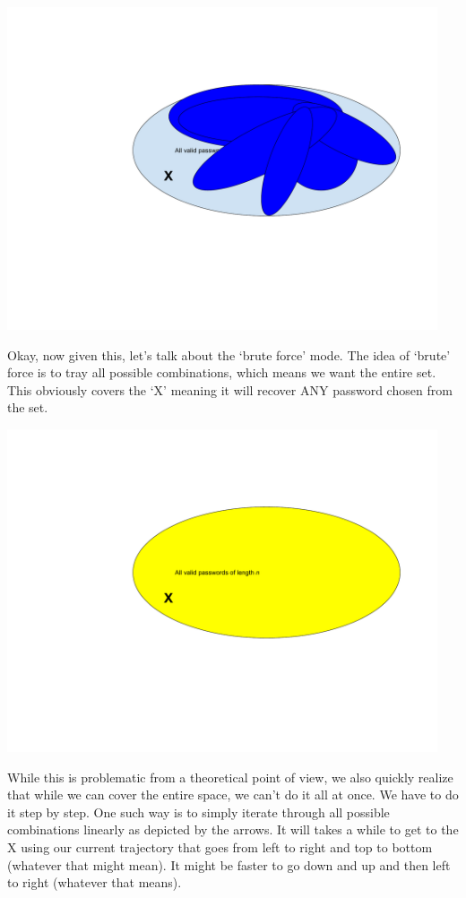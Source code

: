 \includegraphics[width=5in]{Assignments/images/PasswordCracking_7}

Okay, now given this, let’s talk about the ‘brute force’ mode. The idea of ‘brute’ force is to tray all possible combinations, which means we want the entire set. This obviously covers the ‘X’ meaning it will recover ANY password chosen from the set.

\includegraphics[width=5in]{Assignments/images/PasswordCracking_8}

While this is problematic from a theoretical point of view, we also quickly realize that while we can cover the entire space, we can’t do it all at once. We have to do it step by step. One such way is to simply iterate through all possible combinations linearly as depicted by the arrows. It will takes a while to get to the X using our current trajectory that goes from left to right and top to bottom (whatever that might mean). It might be faster to go down and up and then left to right (whatever that means).

